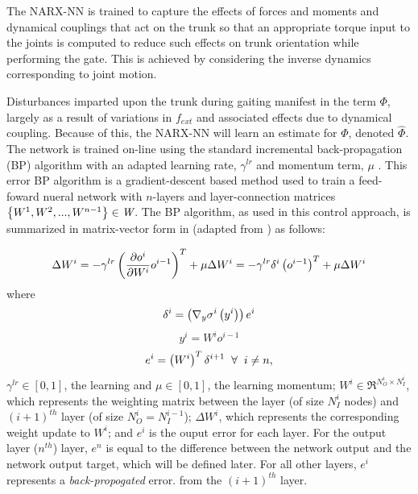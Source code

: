 			The NARX-NN is trained to capture the effects of forces and moments and dynamical couplings that act on the trunk
			so that an appropriate torque input to the joints is computed to reduce such effects on trunk orientation while performing the gate. This is achieved by considering the inverse dynamics corresponding to joint motion.

			Disturbances imparted upon the trunk during gaiting manifest in the term $\Phi$, largely as a result of variations in $f_{ext}$ and associated effects due to dynamical coupling. Because of this, the NARX-NN will learn an estimate for $\Phi$, denoted $\hat{\Phi}$. The network is trained on-line using the standard incremental back-propagation (BP) algorithm with an adapted learning rate, $\gamma^{lr}$ and momentum term, $\mu$ \cite{Rumelhart1988,Rumelhart1995}. This error BP algorithm is a gradient-descent based method used to train a feed-foward nueral network with $n$-layers and layer-connection matrices $\left\{W^{1},W^{2},...,W^{n-1}\right\} \in \emph{W}$. The BP algorithm, as used in this control approach, is summarized in matrix-vector form in (adapted from \cite{Rojas1996ch7}) as follows: 

			\begin{equation}
				\Delta W^{i} =
					-\gamma^{lr} \left( \frac{ \partial o^{i} }{\partial {W^{i} } }  o^{i-1} \right)^{T}  + \mu \Delta W^{i} = 
					-\gamma^{lr} \delta^{i} \left(o^{i-1}\right)^{T}  + \mu \Delta W^{i}
				\label{eq::bp_weight_update}
			\end{equation} 
			where
			\begin{equation*}
				\delta^{i} = \left( \nabla_{y} \sigma^{i}\left(y^{i}\right) \right) e^{i}
				\label{eq::bp_error}
			\end{equation*}
			\begin{equation*}
				y^{i} = W^{i} o^{i-1}
				\label{eq::bp_error}
			\end{equation*}
			\begin{equation*}
				e^{i} =  \left( W^{i} \right)^{T} \delta^{i+1} \hspace{2mm} \forall \hspace{2mm} i\neq n,
			\end{equation*}
			$\gamma^{lr} \in [0,1]$, the learning and  $\mu \in [0,1]$, the learning momentum; $W^{i} \in \Re^{N_{O}^{i}\times N_{I}^{i}}$, which represents the weighting matrix between the \Ith layer (of size $N_{I}^{i}$ nodes) and $(i+1)^{th}$ layer (of size $N_{O}^{i}=N_{I}^{i-1}$); $\Delta W^{i}$, which represents the corresponding weight update to $W^{i}$; and $e^{i}$ is the ouput error for each \Ith layer. For the output layer ($n^{th}$) layer, $e^{n}$ is equal to the difference between the network output and the network output target, which will be defined later. For all other layers, $e^{i}$ represents a \emph{back-propogated} error. from the $(i+1)^{th}$ layer.


